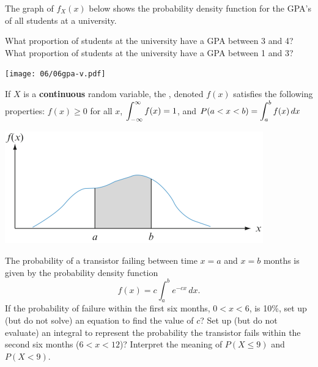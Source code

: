 \begin{multicols}{2}
\ii The graph of $f_X(x)$ below shows the probability density function for the GPA's of all students at a university.\label{gpa-v}

\bb
\ii What proportion of students at the university have a GPA between 3 and 4? \vspace{0.5in}
\ii What proportion of students at the university have a GPA between 1 and 3?
\ee

\columnbreak

\texttt{[image: 06/06gpa-v.pdf]}

\end{multicols} \vspace{0.5in}

\ee

\clearpage


\begin{tcolorbox}
\begin{multicols}{2}

\begin{definition}\label{def:pdf}
If $X$ is a \textbf{continuous} random variable, the \textbf{}, denoted $f(x)$ satisfies the following properties:
\bi
\ii $f(x) \geq 0$ for all $x$,
\ii $\displaystyle \int_{-\infty}^{\infty} f(x) = 1$, and 
\ii $\displaystyle P(a < x < b) = \int_a^b f(x) \, dx$
\ei
\end{definition}

\columnbreak

\includegraphics[width=0.5\tw]{06/06area1.png}
\end{multicols}
\end{tcolorbox}

\bb
\ii The probability of a transistor failing between time $x=a$ and $x=b$ months is given by the probability density function\label{transistor}
\[ f(x) = c \int_a^b e^{-cx} \, dx.\]
\bb
\ii If the probability of failure within the first six months, $0 < x < 6$, is 10\%, set up (but do not solve) an equation to find the value of $c$? \vfill
\ii Set up (but do not evaluate) an integral to represent the probability the transistor fails within the second six months ($6<x<12$)? \vfill
\ii Interpret the meaning of $P(X \leq 9)$ and $P(X < 9)$.\vfill
\ee
 \ee

